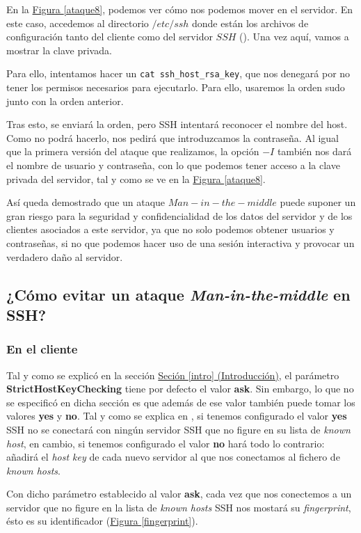 \documentclass[10pt,a4paper,spanish]{article}
\begin{document}
En la \hyperref[ataque8]{Figura \ref*{ataque8}}, podemos ver cómo nos podemos mover en el servidor. En este caso, accedemos al directorio $/etc/ssh$ donde están los archivos de configuración tanto del cliente como del servidor $SSH$ (\cite{sshd}). Una vez aquí, vamos a mostrar la clave privada.

Para ello, intentamos hacer un \texttt{cat ssh\_host\_rsa\_key}, que nos denegará por no tener los permisos necesarios para ejecutarlo. Para ello, usaremos la orden sudo junto con la orden anterior.

Tras esto, se enviará la orden, pero SSH intentará reconocer el nombre del host. Como no podrá hacerlo, nos pedirá que introduzcamos la contraseña. Al igual que la primera versión del ataque que realizamos, la opción $-I$ también nos dará el nombre de usuario y contraseña, con lo que podemos tener acceso a la clave privada del servidor, tal y como se ve en la \hyperref[ataque8]{Figura \ref*{ataque8}}.

Así queda demostrado que un ataque $Man-in-the-middle$ puede suponer un gran riesgo para la seguridad y confidencialidad de los datos del servidor y de los clientes asociados a este servidor, ya que no solo podemos obtener usuarios y contraseñas, si no que podemos hacer uso de una sesión interactiva y provocar un verdadero daño al servidor.

\subsection{¿Cómo evitar un ataque \textit{Man-in-the-middle} en SSH?}
\subsubsection{En el cliente}
Tal y como se explicó en la sección \hyperref[intro]{Seción \ref*{intro} (Introducción)}, el parámetro \textbf{StrictHostKeyChecking} tiene por defecto el valor \textbf{ask}. Sin embargo, lo que no se especificó en dicha sección es que además de ese valor también puede tomar los valores \textbf{yes} y \textbf{no}. Tal y como se explica en \cite{sshconf}, si tenemos configurado el valor \textbf{yes} SSH no se conectará con ningún servidor SSH que no figure en su lista de \textit{known host}, en cambio, si tenemos configurado el valor \textbf{no} hará todo lo contrario: añadirá el \textit{host key} de cada nuevo servidor al que nos conectamos al fichero de \textit{known hosts}.

Con dicho parámetro establecido al valor \textbf{ask}, cada vez que nos conectemos a un servidor que no figure en la lista de \textit{known hosts} SSH nos mostará su \textit{fingerprint}, ésto es su identificador (\hyperref[fingerprint]{Figura \ref*{fingerprint}}). 
\end{document}
